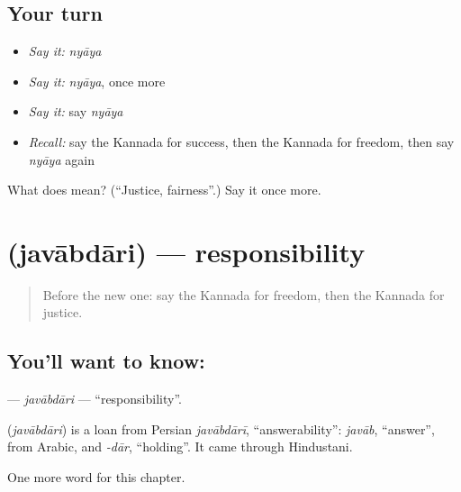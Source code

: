 \subsection*{Your turn}
\begin{itemize}
\raggedright
  \item \emph{Say it:} \emph{nyāya}
  \item \emph{Say it:} \emph{nyāya}, once more
  \item \emph{Say it:} say \emph{nyāya}
  \item \emph{Recall:} say the Kannada for success, then the Kannada for freedom, then say \emph{nyāya} again
\end{itemize}

\begin{tcolorbox}[breakable,colback=teal!4,colframe=teal!35!black,title={Before you move on}]
What does  mean? (\textquotedblleft{}Justice, fairness\textquotedblright{}.) Say it once more.
\end{tcolorbox}
\section[\texorpdfstring{\kn{ಜವಾಬ್ದಾರಿ} (javābdāri)}{ಜವಾಬ್ದಾರಿ (javābdāri)}]{ (javābdāri) — responsibility}

\label{lesson:KA-C216-javabdari}



\begin{quote}
Before the new one: say the Kannada for freedom, then the Kannada for justice.
\end{quote}

\subsection*{You'll want to know: }
\textbf{} — \emph{javābdāri} — \textquotedblleft{}responsibility\textquotedblright{}.

\begin{cousinweb}
\textbf{} (\emph{javābdāri}) is a loan from Persian \emph{javābdārī}, \textquotedblleft{}answerability\textquotedblright{}: \emph{javāb}, \textquotedblleft{}answer\textquotedblright{}, from Arabic, and \emph{-dār}, \textquotedblleft{}holding\textquotedblright{}. It came through Hindustani.
\end{cousinweb}

\begin{grammarlens}[title={What you've built}]
One more word for this chapter.
\end{grammarlens}

